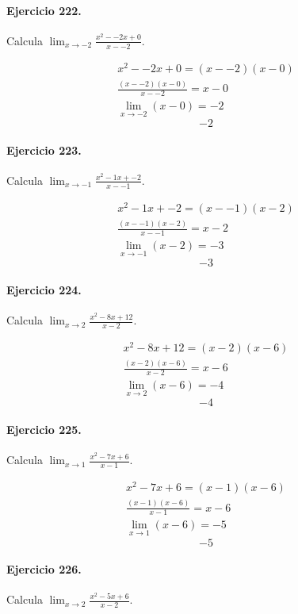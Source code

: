 \documentclass[11pt,a4paper]{article}
\begin{document}
\paragraph{Ejercicio 222.} Calcula $\displaystyle\lim_{x\to -2}\frac{x^2--2x+0}{x--2}$. 

\[
\begin{aligned}
x^2--2x+0=(x--2)(x-0)\\
\frac{(x--2)(x-0)}{x--2}=x-0\\
\lim_{x\to -2}(x-0)=-2
\end{aligned}
\]
\[\boxed{-2}\]


\paragraph{Ejercicio 223.} Calcula $\displaystyle\lim_{x\to -1}\frac{x^2-1x+-2}{x--1}$. 

\[
\begin{aligned}
x^2-1x+-2=(x--1)(x-2)\\
\frac{(x--1)(x-2)}{x--1}=x-2\\
\lim_{x\to -1}(x-2)=-3
\end{aligned}
\]
\[\boxed{-3}\]


\paragraph{Ejercicio 224.} Calcula $\displaystyle\lim_{x\to 2}\frac{x^2-8x+12}{x-2}$. 

\[
\begin{aligned}
x^2-8x+12=(x-2)(x-6)\\
\frac{(x-2)(x-6)}{x-2}=x-6\\
\lim_{x\to 2}(x-6)=-4
\end{aligned}
\]
\[\boxed{-4}\]


\paragraph{Ejercicio 225.} Calcula $\displaystyle\lim_{x\to 1}\frac{x^2-7x+6}{x-1}$. 

\[
\begin{aligned}
x^2-7x+6=(x-1)(x-6)\\
\frac{(x-1)(x-6)}{x-1}=x-6\\
\lim_{x\to 1}(x-6)=-5
\end{aligned}
\]
\[\boxed{-5}\]


\paragraph{Ejercicio 226.} Calcula $\displaystyle\lim_{x\to 2}\frac{x^2-5x+6}{x-2}$. 
\end{document}
